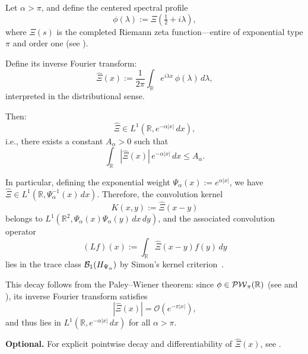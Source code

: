 \begin{lemma}
\label{lem:weighted_L1_inverse_FT_xi}
Let \( \alpha > \pi \), and define the centered spectral profile
\[
\phi(\lambda) := \Xi\left( \tfrac{1}{2} + i\lambda \right),
\]
where \( \Xi(s) \) is the completed Riemann zeta function—entire of exponential type \( \pi \) and order one (see ).

Define its inverse Fourier transform:
\[
\widehat{\Xi}(x) := \frac{1}{2\pi} \int_{\mathbb{R}} e^{i\lambda x} \, \phi(\lambda)\, d\lambda,
\]
interpreted in the distributional sense.

Then:
\[
\widehat{\Xi} \in L^1(\mathbb{R}, e^{-\alpha |x|}\, dx),
\]
i.e., there exists a constant \( A_\alpha > 0 \) such that
\[
\int_{\mathbb{R}} |\widehat{\Xi}(x)| \, e^{-\alpha |x|}\, dx \le A_\alpha.
\]

\medskip
\noindent
In particular, defining the exponential weight \( \Psi_\alpha(x) := e^{\alpha |x|} \), we have \( \widehat{\Xi} \in L^1(\mathbb{R}, \Psi_\alpha^{-1}(x)\, dx) \). Therefore, the convolution kernel
\[
K(x,y) := \widehat{\Xi}(x - y)
\]
belongs to \( L^1(\mathbb{R}^2, \Psi_\alpha(x)\Psi_\alpha(y)\, dx\,dy) \), and the associated convolution operator
\[
(L f)(x) := \int_{\mathbb{R}} \widehat{\Xi}(x - y) f(y)\, dy
\]
lies in the trace class \( \mathcal{B}_1(H_{\Psi_\alpha}) \) by Simon’s kernel criterion~\cite[Thm.~4.2]{Simon2005TraceIdeals}.

\medskip
\noindent
This decay follows from the Paley--Wiener theorem: since \( \phi \in \mathcal{PW}_{\pi}(\mathbb{R}) \) (see  and ), its inverse Fourier transform satisfies
\[
|\widehat{\Xi}(x)| = \mathcal{O}(e^{-\pi |x|}),
\]
and thus lies in \( L^1(\mathbb{R}, e^{-\alpha |x|}\, dx) \) for all \( \alpha > \pi \).

\medskip
\noindent
\textbf{Optional.} For explicit pointwise decay and differentiability of \( \widehat{\Xi}(x) \), see .
\end{lemma}
